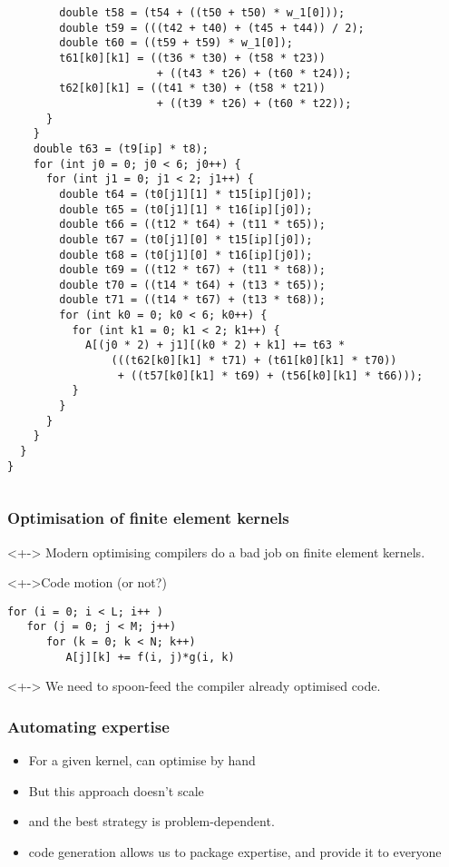 \documentclass[presentation]{beamer}
\begin{document}
\begin{frame}
\begin{columns}
\begin{column}{0.5\textwidth}
\begin{verbatim}
        double t58 = (t54 + ((t50 + t50) * w_1[0]));
        double t59 = (((t42 + t40) + (t45 + t44)) / 2);
        double t60 = ((t59 + t59) * w_1[0]);
        t61[k0][k1] = ((t36 * t30) + (t58 * t23))
                       + ((t43 * t26) + (t60 * t24));
        t62[k0][k1] = ((t41 * t30) + (t58 * t21))
                       + ((t39 * t26) + (t60 * t22));
      }
    }
    double t63 = (t9[ip] * t8);
    for (int j0 = 0; j0 < 6; j0++) {
      for (int j1 = 0; j1 < 2; j1++) {
        double t64 = (t0[j1][1] * t15[ip][j0]);
        double t65 = (t0[j1][1] * t16[ip][j0]);
        double t66 = ((t12 * t64) + (t11 * t65));
        double t67 = (t0[j1][0] * t15[ip][j0]);
        double t68 = (t0[j1][0] * t16[ip][j0]);
        double t69 = ((t12 * t67) + (t11 * t68));
        double t70 = ((t14 * t64) + (t13 * t65));
        double t71 = ((t14 * t67) + (t13 * t68));
        for (int k0 = 0; k0 < 6; k0++) {
          for (int k1 = 0; k1 < 2; k1++) {
            A[(j0 * 2) + j1][(k0 * 2) + k1] += t63 *
                (((t62[k0][k1] * t71) + (t61[k0][k1] * t70))
                 + ((t57[k0][k1] * t69) + (t56[k0][k1] * t66)));
          }
        }
      }
    }
  }
}
\end{verbatim}
    \end{column}
  \end{columns}
\end{frame}

\begin{frame}[fragile]
  \frametitle{Optimisation of finite element kernels}
  
  \begin{problem}<+->
    Modern optimising compilers do a bad job on finite element
    kernels.
  \end{problem}
  \begin{exampleblock}<+->{Code motion (or not?)}
\begin{verbatim}
for (i = 0; i < L; i++ )
   for (j = 0; j < M; j++)
      for (k = 0; k < N; k++)
         A[j][k] += f(i, j)*g(i, k)
\end{verbatim}
  \end{exampleblock}
  \begin{corollary}<+->
    We need to spoon-feed the compiler already optimised code.
  \end{corollary}
\end{frame}

\begin{frame}
  \frametitle{Automating expertise}
  \begin{itemize}
  \item For a given kernel, can optimise by hand
  \item But this approach doesn't scale
  \item and the best strategy is problem-dependent.
  \item code generation allows us to package expertise, and provide it
    to everyone
  \end{itemize}
\end{frame}
\end{document}
